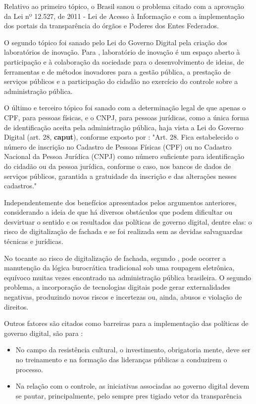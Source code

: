 Relativo ao primeiro tópico, o Brasil sanou o problema citado com a aprovação da Lei nº 12.527, de 2011 - Lei de Acesso à Informação e com a implementação dos portais da transparência do órgãos e Poderes dos Entes Federados.

O segundo tópico foi sanado pelo Lei do Governo Digital pela criação dos laboratórios de inovação. Para \cite{l14129}, laboratório de inovação é um espaço aberto à participação e à colaboração da sociedade para o desenvolvimento de ideias, de ferramentas e de métodos inovadores para a gestão pública, a prestação de serviços públicos e a participação do cidadão no exercício do controle sobre a administração pública.

O último e terceiro tópico foi sanado com a determinação legal de que apenas o CPF, para pessoas físicas, e o CNPJ, para pessoas jurídicas, como a única forma de identificação aceita pela administração pública, haja vista a Lei do Governo Digital (art. 28, \textbf{caput}), conforme exposto por \cite{l14129}: "Art. 28.  Fica estabelecido o número de inscrição no Cadastro de Pessoas Físicas (CPF) ou no Cadastro Nacional da Pessoa Jurídica (CNPJ) como número suficiente para identificação do cidadão ou da pessoa jurídica, conforme o caso, nos bancos de dados de serviços públicos, garantida a gratuidade da inscrição e das alterações nesses cadastros."

Independentemente dos benefícios apresentados pelos argumentos anteriores, considerando \cite{de2020governo} a ideia de que há diversos obstáculos que podem dificultar ou desvirtuar o sentido e os resultados das políticas de governo digital, dentre elas: o risco de digitalização de fachada e se foi realizada sem as devidas salvaguardas técnicas e jurídicas.

No tocante ao risco de digitalização de fachada, segundo \cite{de2020governo}, pode ocorrer a manutenção da lógica burocrática tradicional sob uma roupagem eletrônica, equívoco muitas vezes encontrado na administração pública brasileira. O segundo problema, a incorporação de tecnologias digitais pode gerar externalidades negativas, produzindo novos riscos e incertezas ou, ainda, abusos e violação de direitos.

Outros fatores são citados como barreiras para a implementação das políticas de governo digital, são para \cite{do2022governo}: 

\begin{itemize}
    \item No campo da resistência cultural, o investimento, obrigatoria
    mente, deve ser no treinamento e na formação das lideranças públicas 
    a conduzirem o processo.
    \item Na relação com o controle, as iniciativas associadas 
    ao governo digital devem se pautar, principalmente, pelo sempre pres
    tigiado vetor da transparência
\end{itemize}

